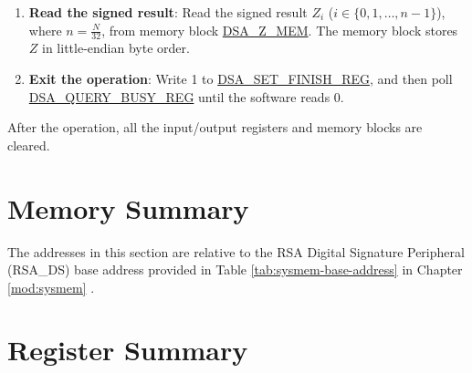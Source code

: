 \documentclass[main\_\_EN.tex]{subfiles}
\begin{document}
\begin{enumerate}
    \item {\bfseries Read the signed result}: Read the signed result \begin{math}Z_{i}\end{math} (\begin{math}i \in \{0, 1, \dots, n-1\}\end{math}), where \begin{math} n = \frac{N}{32} \end{math}, from memory block \hyperref[DSAZMEM]{DSA\_Z\_MEM}. The memory block stores \begin{math}Z\end{math} in little-endian byte order.

    \item {\bfseries Exit the operation\label{other:digsig-step-exit}}: Write 1 to \hyperref[regdesc:DSASETFINISHREG]{DSA\_SET\_FINISH\_REG}, and then poll \hyperref[regdesc:DSAQUERYBUSYREG]{DSA\_QUERY\_BUSY\_REG} until the software reads 0.

\end{enumerate}

After the operation, all the input/output registers and memory blocks are cleared.


\newpage
\section{Memory Summary}
\label{sec:digsig-mem-summ}

The addresses in this section are relative to the RSA Digital Signature Peripheral (RSA\_DS) base address provided in Table \ref{tab:sysmem-base-address} in Chapter \ref{mod:sysmem} \textit{}.







\newpage
\hypertarget{digsig-reg-summ}{}
\section{Register Summary}
\label{sec:digsig-reg-summ}
\end{document}
